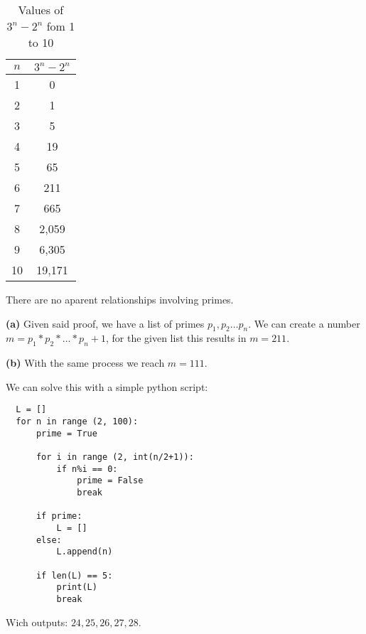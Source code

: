 \begin{table}[h]
  \centering
  \label{tab:3n_minus_2n}
  \begin{tabular}{|c|c|}
    \hline
    $n$ & $3^n - 2^n$\\
    \hline
    1 & 0\\
    2 & 1\\
    3 & 5\\
    4 & 19\\
    5 & 65\\
    6 & 211\\
    7 & 665\\
    8 & 2,059\\
    9 & 6,305\\
    10 & 19,171\\
    \hline
  \end{tabular}
  \caption{Values of $3^n - 2^n$ fom 1 to 10}
\end{table}

There are no aparent relationships involving primes.  


\sol \textbf{(a)} Given said proof, we have a list of primes $p_1,p_2 \ldots p_n$.
We can create a number $m = p_1 * p_2 * \ldots * p_n + 1$, for the given list this results in $m = 211$.

\sol \textbf{(b)} With the same process we reach $m = 111$.


\sol 
We can solve this with a simple python script:
\begin{verbatim}
  L = []
  for n in range (2, 100):
      prime = True

      for i in range (2, int(n/2+1)):
          if n%i == 0:
              prime = False
              break

      if prime:
          L = []
      else:
          L.append(n)

      if len(L) == 5:
          print(L)
          break
\end{verbatim}
Wich outputs: $24, 25, 26, 27, 28$.
 
